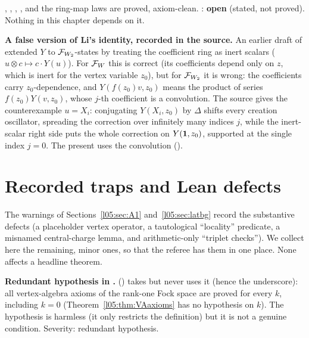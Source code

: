 \begin{status}
, , , ,  and the ring-map laws are proved, axiom-clean.
: \textbf{open} (stated, not proved). Nothing in this chapter depends on it.
\end{status}

\begin{warning}
\textbf{A false version of Li's identity, recorded in the source.} An earlier draft of  extended $Y$ to
$\mathcal{F}_{W_2}$-states by treating the coefficient ring as inert scalars ($u\otimes c\mapsto c\cdot Y(u)$). For $\mathcal{F}_W$ this is
correct (its coefficients depend only on $z$, which is inert for the vertex variable $z_0$), but for $\mathcal{F}_{W_2}$ it is wrong:
the coefficients carry $z_0$-dependence, and $Y(f(z_0)v,z_0)$ means the product of series $f(z_0)Y(v,z_0)$, whose
$j$-th coefficient is a convolution. The source gives the counterexample $u=X_i$: conjugating $Y(X_i,z_0)$ by
$\Delta$ shifts every creation oscillator, spreading the correction over infinitely many indices $j$, while the inert-scalar
right side puts the whole correction on $Y(\mathbf{1},z_0)$, supported at the single index $j=0$. The present
 uses the convolution ().
\end{warning}

\section{Recorded traps and Lean defects}\label{l05:sec:traps}

The warnings of Sections~\ref{l05:sec:A1} and~\ref{l05:sec:latbg} record the substantive defects (a placeholder vertex
operator, a tautological ``locality'' predicate, a misnamed central-charge lemma, and arithmetic-only ``triplet checks'').
We collect here the remaining, minor ones, so that the referee has them in one place. None affects a headline theorem.

\begin{warning}
\textbf{Redundant hypothesis in .}  ()
takes  but never uses it (hence the underscore): all vertex-algebra axioms of the rank-one Fock space are
proved for every $k$, including $k=0$ (Theorem~\ref{l05:thm:VAaxioms} has no hypothesis on $k$). The hypothesis is
harmless (it only restricts the definition) but it is not a genuine condition. Severity: redundant hypothesis.
\end{warning}

